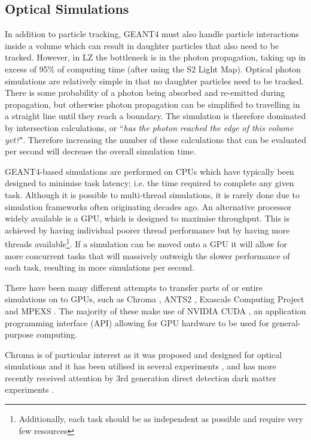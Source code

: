 \subsection{Optical Simulations}
\par
In addition to particle tracking, GEANT4 must also handle particle interactions inside a volume which can result in daughter particles that also need to be tracked.
However, in LZ the bottleneck is in the photon propagation, taking up in excess of 95\% of computing time (after using the S2 Light Map).
Optical photon simulations are relatively simple in that no daughter particles need to be tracked.
There is some probability of a photon being absorbed and re-emitted during propagation, but otherwise photon propagation can be simplified to travelling in a straight line until they reach a boundary.
The simulation is therefore dominated by intersection calculations, or ``\textit{has the photon reached the edge of this volume yet?}".
Therefore increasing the number of these calculations that can be evaluated per second will decrease the overall simulation time.
\par
GEANT4-based simulations are performed on CPUs which have typically been designed to minimise task latency; i.e. the time required to complete any given task.
Although it is possible to multi-thread simulations, it is rarely done due to simulation frameworks often originating decades ago.
An alternative processor widely available is a GPU, which is designed to maximise throughput.
This is achieved by having individual poorer thread performance but by having more threads available\footnote{Additionally, each task should be as independent as possible and require very few resources}.
If a simulation can be moved onto a GPU it will allow for more concurrent tasks that will massively outweigh the slower performance of each task, resulting in more simulations per second.
\par
There have been many different attempts to transfer parts of or entire simulations on to GPUs, such as Chroma \cite{chroma_whitepaper_ref}, ANTS2 \cite{ants2_whitepaper_ref}, Exascale Computing Project \cite{ExaSMR_whitepaper_ref} and MPEXS \cite{mpexs_whitepaper_ref}.
The majority of these make use of NVIDIA CUDA \cite{cuda_ref}, an application programming interface (API) allowing for GPU hardware to be used for general-purpose computing.
\par
Chroma is of particular interest as it was proposed and designed for optical simulations and it has been utilised in several experiments \cite{chroma_with_tpcs1_ref,chroma_with_tpcs2_ref,chroma_with_tpcs3_ref}, and has more recently received attention by 3rd generation direct detection dark matter experiments \cite{DARWIN_GPU_simulations_2022_ref}.
